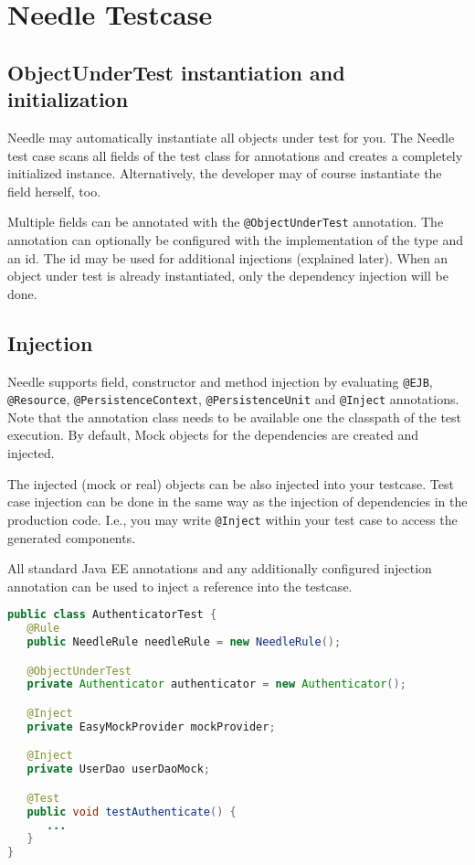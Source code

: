 \chapter{Needle Testcase}

\section{ObjectUnderTest instantiation and initialization}
\label{sec: ObjectUnderTest}

Needle may automatically instantiate all objects under test for you.
The Needle test case scans all fields of the test class for annotations and creates a completely initialized instance. Alternatively, the 
developer may of course instantiate the field herself, too.

Multiple fields can be annotated with the \verb|@ObjectUnderTest| annotation. The annotation can optionally be configured with the implementation of the type and an id.
The id may be used for additional injections (explained later). When an object under test is already instantiated, only the dependency injection will be done.

\section{Injection}
\label{sec:Injection}

Needle supports field, constructor and method injection by evaluating \verb|@EJB|, \verb|@Resource|, \verb|@PersistenceContext|, \verb|@PersistenceUnit|
and \verb|@Inject| annotations. Note that the annotation class needs to be available one the classpath of the test execution.
By default, Mock objects for the dependencies are created and injected.

The injected (mock or real) objects can be also injected into your testcase. Test case injection can be done in the same way as the injection of dependencies in the production code. I.e., you may write \verb|@Inject| within your test case to access
the generated components.

All standard Java EE annotations and any additionally configured injection annotation can be used to inject a reference into the testcase.

\begin{lstlisting}[language={JAVA},caption=Testcase injection]
public class AuthenticatorTest {
   @Rule
   public NeedleRule needleRule = new NeedleRule();

   @ObjectUnderTest
   private Authenticator authenticator = new Authenticator();

   @Inject
   private EasyMockProvider mockProvider;

   @Inject
   private UserDao userDaoMock;

   @Test
   public void testAuthenticate() {
      ...
   }
}
\end{lstlisting}

